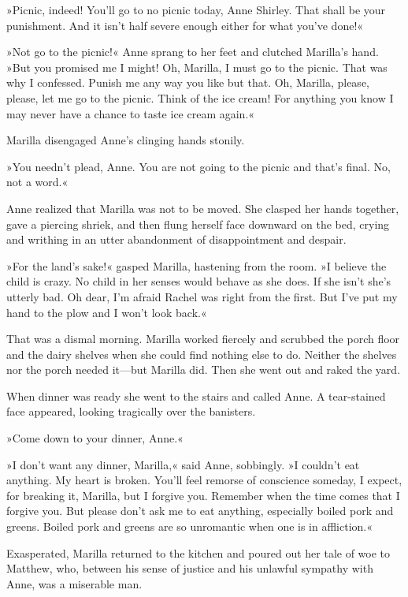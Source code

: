 »Picnic, indeed! You’ll go to no picnic today, Anne Shirley. That shall be your punishment. And it isn’t half severe enough either for what you’ve done!«

»Not go to the picnic!« Anne sprang to her feet and clutched Marilla’s hand. »But you promised me I might! Oh, Marilla, I must go to the picnic. That was why I confessed. Punish me any way you like but that. Oh, Marilla, please, please, let me go to the picnic. Think of the ice cream! For anything you know I may never have a chance to taste ice cream again.«

Marilla disengaged Anne’s clinging hands stonily.

»You needn’t plead, Anne. You are not going to the picnic and that’s final. No, not a word.«

Anne realized that Marilla was not to be moved. She clasped her hands together, gave a piercing shriek, and then flung herself face downward on the bed, crying and writhing in an utter abandonment of disappointment and despair.

»For the land’s sake!« gasped Marilla, hastening from the room. »I believe the child is crazy. No child in her senses would behave as she does. If she isn’t she’s utterly bad. Oh dear, I’m afraid Rachel was right from the first. But I’ve put my hand to the plow and I won’t look back.«

That was a dismal morning. Marilla worked fiercely and scrubbed the porch floor and the dairy shelves when she could find nothing else to do. Neither the shelves nor the porch needed it—but Marilla did. Then she went out and raked the yard.

When dinner was ready she went to the stairs and called Anne. A tear-stained face appeared, looking tragically over the banisters.

»Come down to your dinner, Anne.«

»I don’t want any dinner, Marilla,« said Anne, sobbingly. »I couldn’t eat anything. My heart is broken. You’ll feel remorse of conscience someday, I expect, for breaking it, Marilla, but I forgive you. Remember when the time comes that I forgive you. But please don’t ask me to eat anything, especially boiled pork and greens. Boiled pork and greens are so unromantic when one is in affliction.«

Exasperated, Marilla returned to the kitchen and poured out her tale of woe to Matthew, who, between his sense of justice and his unlawful sympathy with Anne, was a miserable man.

